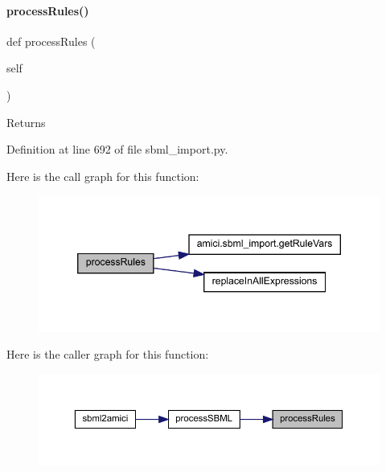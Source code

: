 \paragraph{\texorpdfstring{processRules()}{processRules()}}
{\footnotesize\ttfamily def process\+Rules (\begin{DoxyParamCaption}\item[{}]{self }\end{DoxyParamCaption})}

\begin{DoxyReturn}{Returns}

\end{DoxyReturn}


Definition at line 692 of file sbml\+\_\+import.\+py.

Here is the call graph for this function\+:
\nopagebreak
\begin{figure}[H]
\begin{center}
\leavevmode
\includegraphics[width=346pt]{classamici_1_1sbml__import_1_1_sbml_importer_a7df6b4ae4e3e757bc8de5e0cc54fe16b_cgraph}
\end{center}
\end{figure}
Here is the caller graph for this function\+:
\nopagebreak
\begin{figure}[H]
\begin{center}
\leavevmode
\includegraphics[width=350pt]{classamici_1_1sbml__import_1_1_sbml_importer_a7df6b4ae4e3e757bc8de5e0cc54fe16b_icgraph}
\end{center}
\end{figure}
\mbox{\label{classamici_1_1sbml__import_1_1_sbml_importer_af2a2cbf8550d30fc0e95a875758b8262}} 
